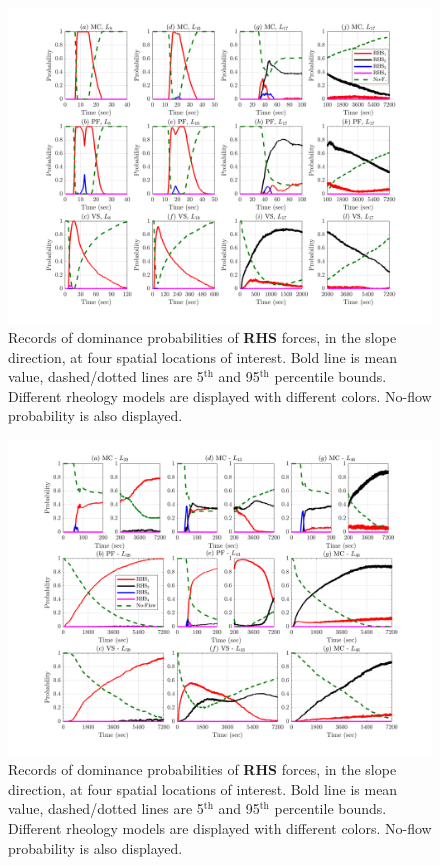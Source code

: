 \documentclass{article}
\begin{document}
\begin{figure}[H]
         \centering
        \includegraphics[width=1\textwidth]{BAF_VolcanDeColima/ForceContrib/Pr1_total.png}
        \caption{Records of dominance probabilities of \textbf{RHS} forces, in the slope direction, at four spatial locations of interest. Bold line is mean value, dashed/dotted lines are 5$^{\mathrm{th}}$ and 95$^{\mathrm{th}}$ percentile bounds. Different rheology models are displayed with different colors. No-flow probability is also displayed.}
        \label{fig:Colima-Pr1}
\end{figure}

\begin{figure}[H]
         \centering
        \includegraphics[width=1\textwidth]{BAF_VolcanDeColima/ForceContrib/Pr2_total.png}
        \caption{Records of dominance probabilities of \textbf{RHS} forces, in the slope direction, at four spatial locations of interest. Bold line is mean value, dashed/dotted lines are 5$^{\mathrm{th}}$ and 95$^{\mathrm{th}}$ percentile bounds. Different rheology models are displayed with different colors. No-flow probability is also displayed.}
        \label{fig:Colima-Pr2}
\end{figure}
\end{document}
